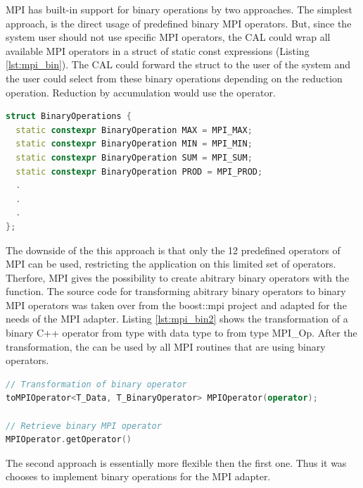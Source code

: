 MPI has built-in support for binary operations by two approaches. The
simplest approach, is the direct usage of predefined binary MPI
operators\cite{ref:mpi_bin_op}. But, since the system user should not
use specific MPI operators, the CAL could wrap all available MPI
operators in a struct of static const expressions (Listing
\ref{lst:mpi_bin}).  The CAL could forward the struct to the user of
the system and the user could select from these binary operations
depending on the reduction operation. Reduction by accumulation would
use the  operator.


\begin{lstlisting}[language=C++, caption={A small collection of binary operators by transformed MPI operations to static constexpression }, label=lst:mpi_bin]
struct BinaryOperations { 
  static constexpr BinaryOperation MAX = MPI_MAX; 
  static constexpr BinaryOperation MIN = MPI_MIN; 
  static constexpr BinaryOperation SUM = MPI_SUM; 
  static constexpr BinaryOperation PROD = MPI_PROD; 
  .
  .
  . 
};
\end{lstlisting}


The downside of the this approach is that only the 12 predefined
operators of MPI can be used, restricting the application on this
limited set of operators. Therfore, MPI gives the possibility to
create abitrary binary operators with the 
function.  The source code for transforming abitrary binary operators
to binary MPI operators was taken over from the boost::mpi project
\cite{ref:boost_mpi} and adapted for the needs of the MPI adapter.
Listing \ref{lst:mpi_bin2} shows the transformation of a binary C++
operator  from type  with data type
 to  from type {MPI\_Op}.  After the
transformation, the  can be used by all MPI routines
that are using binary operators.


\begin{lstlisting}[language=C++, caption={ }, label=lst:mpi_bin2]
// Transformation of binary operator
toMPIOperator<T_Data, T_BinaryOperator> MPIOperator(operator);

// Retrieve binary MPI operator
MPIOperator.getOperator()
\end{lstlisting}


The second approach is essentially more flexible then the first
one. Thus it was chooses to implement binary operations for the
MPI adapter.


